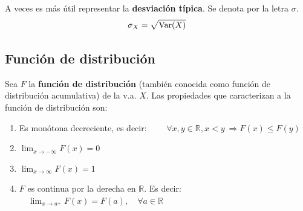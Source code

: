 \documentclass[a4paper]{book}
\begin{document}
A veces es más útil representar la \textbf{desviación típica}. Se denota por la letra $\sigma$.
\[\sigma _X = \sqrt{\operatorname{Var}(X)}\]

\subsection{Función de distribución}

Sea $F$ la \textbf{función de distribución} (también conocida como función de distribución acumulativa) de la v.a. $X$. Las propiedades que caracterizan a la función de distribución son:

\begin{enumerate}
	\item Es monótona decreciente, es decir: $\displaystyle{\qquad \forall x , y\in \mathbb{R}, x<y \ \Rightarrow F(x) \leq F(y)}$
	\item $\displaystyle{\lim_{x \to -\infty} F(x)=0}$
	\item $\displaystyle{\lim_{x \to \infty} F(x)=1}$
	\item $F$ es continua por la derecha en $ \mathbb{R} $. Es decir: $\displaystyle{\quad \lim_{x \to a^+} F(x)=F(a), \quad \forall a \in \mathbb{R}}$
\end{enumerate}

%
%
\end{document}
